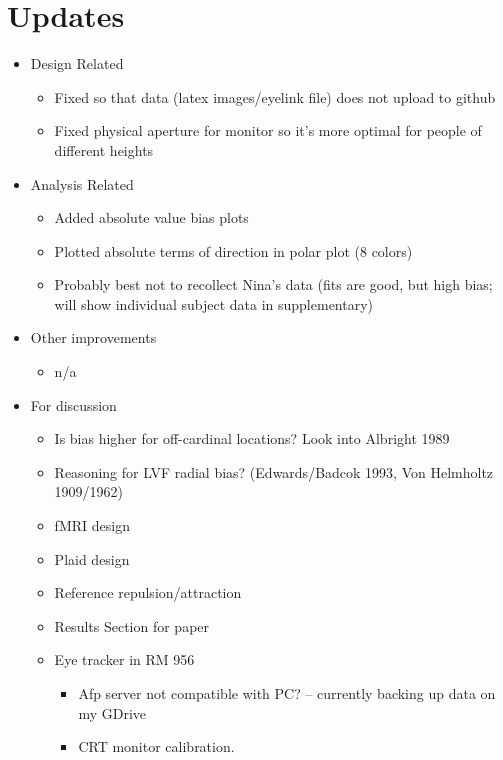 \documentclass[11pt]{article} %
\begin{document}
\section{Updates} 
\begin{itemize}
\item Design Related
	\begin{itemize}
	\item Fixed so that data (latex images/eyelink file) does not upload to github
	\item Fixed physical aperture for monitor so it's more optimal for people of different heights
	\end{itemize}
\item Analysis Related
	\begin{itemize}
	\item Added absolute value bias plots
	\item Plotted absolute terms of direction in polar plot (8 colors)
	\item Probably best not to recollect Nina's data (fits are good, but high bias; will show individual subject data in supplementary)
	\end{itemize}
\item Other improvements
	\begin{itemize}
	\item n/a
	\end{itemize}
\item For discussion
	\begin{itemize}
	\item Is bias higher for off-cardinal locations? Look into Albright 1989
	\item Reasoning for LVF radial bias? (Edwards/Badcok 1993, Von Helmholtz 1909/1962)
	\item fMRI design
	\item Plaid design
	\item Reference repulsion/attraction
	\item Results Section for paper
	\item Eye tracker in RM 956
		\begin{itemize}
			\item{Afp server not compatible with PC? -- currently backing up data on my GDrive}
			\item{CRT monitor calibration.}
		\end{itemize}
	\end{itemize}
\end{itemize}
\end{document}
